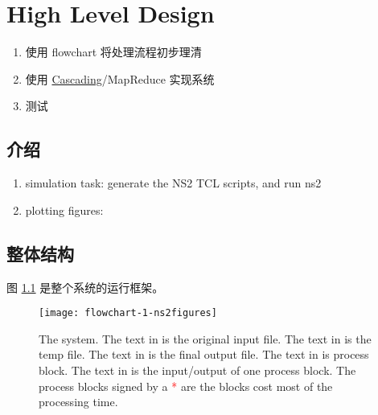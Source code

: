 %

\chapter{High Level Design}



\begin{enumerate}
  \item 使用 flowchart 将处理流程初步理清
  \item 使用 \href{http://www.cascading.org/}{Cascading}/MapReduce 实现系统
  \item 测试
\end{enumerate}


\section{介绍}

\begin{enumerate}
  \item simulation task:
  generate the NS2 TCL scripts, and run ns2

  \item plotting figures:
  
\end{enumerate}


\section{整体结构}
图 \ref{fig:system} 是整个系统的运行框架。

\begin{figure}\centering
  \texttt{[image: flowchart-1-ns2figures]}
  \caption{The system.
    The text in  is the original input file.
    The text in  is the temp file.
    The text in  is the final output file.
    The text in  is process block.
    The text in  is the input/output of one process block.
The process blocks signed by a \textcolor[HTML]{FF0000}{*} are the blocks cost most of the processing time.
  }\label{fig:system}
\end{figure}

